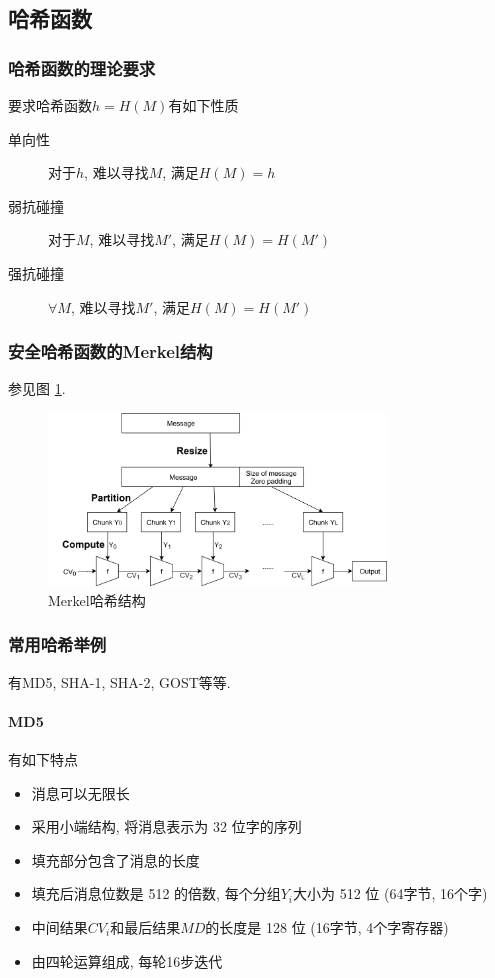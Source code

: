 \documentclass{ctexart}
\begin{document}
\subsection{哈希函数}
\subsubsection{哈希函数的理论要求}
    要求哈希函数$h = H(M)$有如下性质 \begin{description}
        \item[单向性] 对于$h$, 难以寻找$M$, 满足$H(M) = h$
        \item[弱抗碰撞] 对于$M$, 难以寻找$M'$, 满足$H(M) = H(M')$
        \item[强抗碰撞] $\forall M$, 难以寻找$M'$, 满足$H(M) = H(M')$
    \end{description}
\subsubsection{安全哈希函数的Merkel结构} 
    参见图 \ref{merkel-hash}.
    \begin{figure}[ht!]
    \centering
    \includegraphics[width=0.8\textwidth]{merkel-hash}
    \caption{Merkel哈希结构}
    \label{merkel-hash}
    \end{figure}
\subsubsection{常用哈希举例} 有MD5, SHA-1, SHA-2, GOST等等.
\paragraph{MD5} 有如下特点 \begin{itemize}
        \item 消息可以无限长
        \item 采用小端结构, 将消息表示为 32 位字的序列
        \item 填充部分包含了消息的长度
        \item 填充后消息位数是 512 的倍数, 每个分组$Y_i$大小为 512 位 (64字节, 16个字)
        \item 中间结果$CV_i$和最后结果$MD$的长度是 128 位 (16字节, 4个字寄存器)
        \item 由四轮运算组成, 每轮16步迭代
    \end{itemize}
\end{document}
